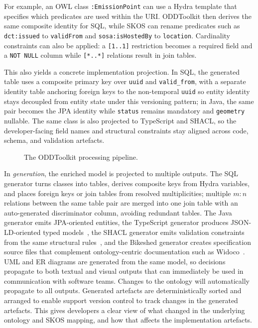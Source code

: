 For example, an OWL class \texttt{:EmissionPoint} can use a Hydra template that specifies which predicates are used within the URI. ODDToolkit then derives the same composite identity for SQL, while SKOS can rename predicates such as \texttt{dct:issued} to \texttt{validFrom} and \texttt{sosa:isHostedBy} to \texttt{location}. Cardinality constraints can also be applied: a \texttt{[1..1]} restriction becomes a required field and a \texttt{NOT NULL} column while \texttt{[*..*]} relations result in join tables.

This also yields a concrete implementation projection. In SQL, the generated table uses a composite primary key over \texttt{uuid} and \texttt{valid\_from}, with a separate identity table anchoring foreign keys to the non-temporal \texttt{uuid} so entity identity stays decoupled from entity state under this versioning pattern; in Java, the same pair becomes the JPA identity while \texttt{status} remains mandatory and \texttt{geometry} nullable. The same class is also projected to TypeScript and SHACL, so the developer-facing field names and structural constraints stay aligned across code, schema, and validation artefacts.

\begin{figure}[ht]
  \centering
  \caption{The ODDToolkit processing pipeline.}
  \label{fig:pipeline}
\end{figure}

In \emph{generation}, the enriched model is projected to multiple outputs. The SQL generator turns classes into tables, derives composite keys from Hydra variables, and places foreign keys or join tables from resolved multiplicities; multiple $m\!:\!n$ relations between the same table pair are merged into one join table with an auto-generated discriminator column, avoiding redundant tables. The Java generator emits JPA-oriented entities, the TypeScript generator produces JSON-LD-oriented typed models~\cite{sporny2020jsonld}, the SHACL generator emits validation constraints from the same structural rules~\cite{knublauch2017shacl,10.1145/3487553.3524253}, and the Bikeshed generator creates specification source files that complement ontology-centric documentation such as Widoco~\cite{atkins2024bikeshed,garijo2017widoco}. UML and ER diagrams are generated from the same model, so decisions propagate to both textual and visual outputs that can immediately be used in communication with software teams. Changes to the ontology will automatically propagate to all outputs. Generated artefacts are deterministically sorted and arranged to enable support version control to track changes in the generated artefacts. This gives developers a clear view of what changed in the underlying ontology and SKOS mapping, and how that affects the implementation artefacts.

